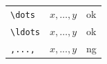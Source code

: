 \documentclass[preview]{standalone}
\newcommand{\tA}[1]{\textcolor{cA}{#1}}
\newcommand{\tD}[1]{\textcolor{cD}{#1}}
\begin{document}
\begin{table}[h]
	\centering
	\begin{tabular}{lll}
		\verb|\dots|  & $x,\dots,y$  & \tA{ok} \\
		\verb|\ldots| & $x,\ldots,y$ & \tA{ok} \\
		\verb|,...,|  & $x,...,y$    & \tD{ng} \\
	\end{tabular}
\end{table}
\end{document}

